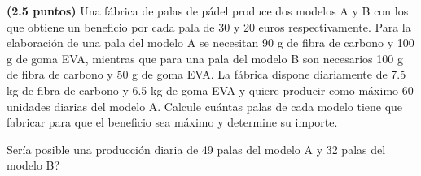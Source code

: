 
\textbf{(2.5 puntos)} Una fábrica de palas de pádel produce dos modelos A y B con los que obtiene un beneficio por cada pala de 30 y 20 euros respectivamente. Para la elaboración de una pala del modelo A se necesitan 90 g de fibra de carbono y 100 g de goma EVA, mientras que para una pala del modelo B son necesarios 100 g de fibra de carbono y 50 g de goma EVA. La fábrica dispone diariamente de 7.5 kg de fibra de carbono y 6.5 kg de goma EVA y quiere producir como máximo 60 unidades diarias del modelo A. Calcule cuántas palas de cada modelo tiene que fabricar para que el beneficio sea máximo y determine su importe.

\textquestiondown{}Sería posible una producción diaria de 49 palas del modelo A y 32 palas del modelo B?
